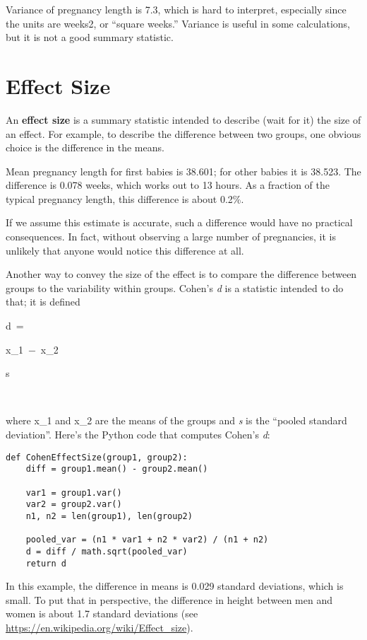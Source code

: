 \documentclass[]{book}
\begin{document}
Variance of pregnancy length is 7.3,
which is hard to interpret, especially since the units are
weeks2, or ``square weeks.'' Variance is useful in some
calculations, but it is not a good summary statistic.

\hypertarget{effect-size}{%
\section{Effect Size}\label{effect-size}}

An \textbf{effect
size} is a summary statistic intended to describe (wait for it)
the size of an effect. For example, to describe the difference between
two groups, one obvious choice is the difference in the means.

Mean pregnancy length for first babies is
38.601; for other babies it is 38.523. The difference is 0.078 weeks,
which works out to 13 hours. As a fraction of the typical pregnancy
length, this difference is about 0.2\%.

If we assume this estimate is accurate,
such a difference would have no practical consequences. In fact, without
observing a large number of pregnancies, it is unlikely that anyone
would notice this difference at all.

Another way to convey the size of the
effect is to compare the difference between groups to the variability
within groups. Cohen's \emph{d} is a
statistic intended to do that; it is defined

{d}~=~

{x\_1}~−~{x\_2}

{s}

~~

where {x\_1} and {x\_2} are the means of the groups
and \emph{s} is the ``pooled standard
deviation''. Here's the Python code that computes Cohen's \emph{d}:

\begin{verbatim}
def CohenEffectSize(group1, group2):
    diff = group1.mean() - group2.mean()

    var1 = group1.var()
    var2 = group2.var()
    n1, n2 = len(group1), len(group2)

    pooled_var = (n1 * var1 + n2 * var2) / (n1 + n2)
    d = diff / math.sqrt(pooled_var)
    return d
\end{verbatim}

In this example, the difference in means
is 0.029 standard deviations, which is small. To put that in
perspective, the difference in height between men and women is about 1.7
standard deviations (see \url{https://en.wikipedia.org/wiki/Effect_size}).
\end{document}
